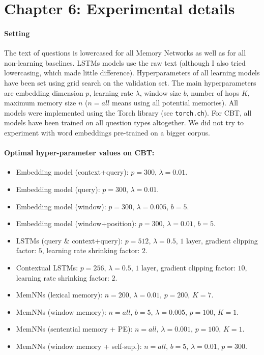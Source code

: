 \label{appendixmem}


\section{Chapter 6: Experimental details} \label{ap:hp}

\paragraph{Setting}
The text of questions is lowercased for all Memory Networks as
well as for all non-learning baselines. LSTMs models use the raw text (although I also tried lowercasing, which made little difference).
%
Hyperparameters of all learning models have been set using
grid search on the validation set.
%
The main hyperparameters are embedding dimension $p$, learning rate
$\lambda$, window size $b$, number of hops $K$, maximum memory size
$n$ ($n=all$ means using all potential memories).
%
All models were implemented using the Torch library (see {\tt torch.ch}).
%
For CBT, all models have been trained on all question types 
altogether. 
%
We did not try to experiment with word embeddings pre-trained on a
bigger corpus.

\paragraph{Optimal hyper-parameter values on CBT:}

\begin{itemize}
\item Embedding model (context+query): $p=300$, $\lambda=0.01$.
\item Embedding model (query): $p=300$, $\lambda=0.01$.
\item Embedding model (window): $p=300$, $\lambda=0.005$, $b=5$.
\item Embedding model (window+position): $p=300$, $\lambda=0.01$, $b=5$.
\item LSTMs (query \& context+query): $p=512$, $\lambda=0.5$, $1$
  layer, gradient clipping factor: $5$, learning rate shrinking factor: $2$.
\item Contextual LSTMs: $p=256$, $\lambda=0.5$, $1$
  layer, gradient clipping factor: $10$, learning rate shrinking
  factor: $2$.
\item MemNNs  (lexical memory): $n=200$, $\lambda=0.01$, $p=200$, $K=7$.
\item MemNNs  (window  memory): $n=all$, $b=5$, $\lambda=0.005$,
  $p=100$, $K=1$.
\item  MemNNs  (sentential memory + PE): $n=all$, $\lambda=0.001$,
  $p=100$, $K=1$.
\item MemNNs  (window  memory + self-sup.): $n=all$, $b=5$, $\lambda=0.01$,
  $p=300$.
\end{itemize}

